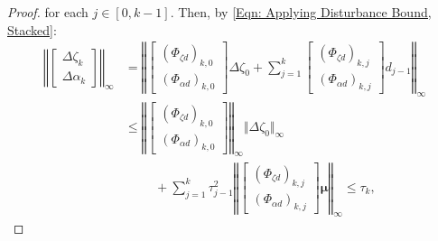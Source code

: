 \documentclass[letterpaper, 10 pt, conference]{ieeeconf}
\newcommand{\?}{\stackrel{?}{=}}
\newcommand{\param}{\theta}
\newcommand{\paramError}{\Delta\param}
\newcommand{\ratePGDError}{\Delta\ratePGD}
\newcommand{\disturbance}{d}
\newcommand{\ratePGD}{\alpha}
\newcommand{\systemResponse}{\Phi}
\newcommand{\state}{\zeta}
\newcommand{\stateError}{\Delta\state}
\newcommand{\tubeSize}{\tau}
\newcommand{\hessianBoundStacked}{\boldsymbol{\mu}}
\begin{document}
\begin{proof}
{}
\hspace{-1mm}for each $j \in [0, k-1]$. 
Then, by \eqref{Eqn: Applying Disturbance Bound, Stacked}:
{
\setlength{\abovedisplayskip}{3.5pt}
\setlength{\belowdisplayskip}{3.5pt}
\begin{align} \nonumber
    \left\Vert 
    \begin{bmatrix}
        \stateError_k \\
        \ratePGDError_k
    \end{bmatrix}
    \right\Vert_\infty &= \left\Vert 
    \begin{bmatrix}
        (\systemResponse_{\state \disturbance})_{k, 0} \\
        (\systemResponse_{\ratePGD \disturbance})_{k, 0}
    \end{bmatrix}
    \stateError_0
    + \sum_{j=1}^{k}
    \begin{bmatrix}
        (\systemResponse_{\state \disturbance})_{k, j} \\
        (\systemResponse_{\ratePGD \disturbance})_{k, j}
    \end{bmatrix}
    \disturbance_{j-1}
    \right\Vert_\infty \\ \label{Eqn: Apply Inequality for Propagating Recursive Tube Bounds, general k}
    &\leq \left\Vert 
    \begin{bmatrix}
        (\systemResponse_{\state \disturbance})_{k, 0} \\
        (\systemResponse_{\ratePGD \disturbance})_{k, 0}
    \end{bmatrix}
    \right\Vert_\infty
    \Vert \stateError_0 \Vert_\infty
    \\ \nonumber
    &\hspace{1cm} + \sum_{j=1}^{k}
    \tubeSize_{j-1}^2
    \left\Vert
    \begin{bmatrix}
        (\systemResponse_{\state \disturbance})_{k, j} \\
        (\systemResponse_{\ratePGD \disturbance})_{k, j}
    \end{bmatrix}
    \hessianBoundStacked
    \right\Vert_\infty \leq \tubeSize_k,

\end{align}}
\end{proof}
\end{document}
